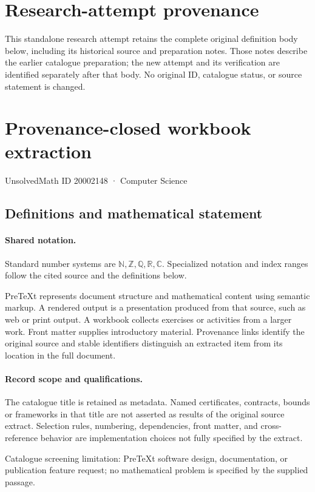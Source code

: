 \documentclass[11pt]{article}
\begin{document}
\section*{Research-attempt provenance}
This standalone research attempt retains the complete original definition body below,
including its historical source and preparation notes. Those notes describe the
earlier catalogue preparation; the new attempt and its verification are identified
separately after that body. No original ID, catalogue status, or source statement is changed.

\section{Provenance-closed workbook extraction}\label{20002148}
{\small UnsolvedMath ID 20002148 · Computer Science}
\subsection{Definitions and mathematical statement}

\paragraph{Shared notation.}Standard number systems are $\mathbb N,\mathbb Z,\mathbb Q,\mathbb R,\mathbb C$. Specialized notation and index ranges follow the cited source and the definitions below.


PreTeXt represents document structure and mathematical content using semantic markup. A rendered output is a presentation produced from that source, such as web or print output. A workbook collects exercises or activities from a larger work. Front matter supplies introductory material. Provenance links identify the original source and stable identifiers distinguish an extracted item from its location in the full document.
\paragraph{Record scope and qualifications.}
The catalogue title is retained as metadata. Named certificates, contracts, bounds or frameworks in that title are not asserted as results of the original source extract.
Selection rules, numbering, dependencies, front matter, and cross-reference behavior are implementation choices not fully specified by the extract.

Catalogue screening limitation: PreTeXt software design, documentation, or publication feature request; no mathematical problem is specified by the supplied passage.
\end{document}
